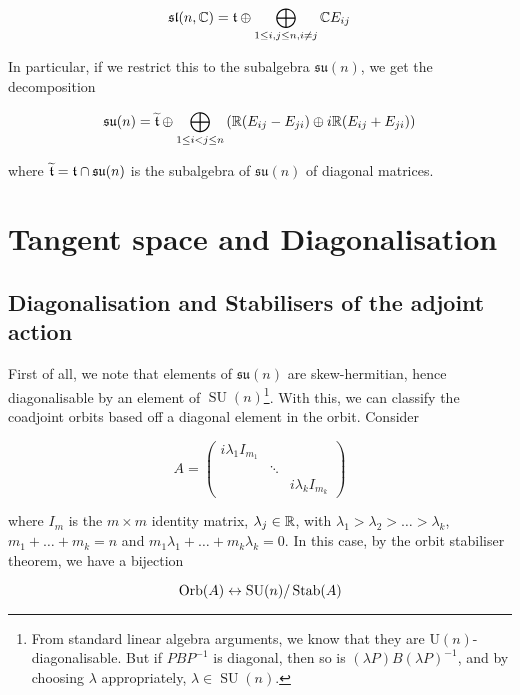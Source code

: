 \documentclass{article}
\DeclareMathOperator{\SU}{SU}
\newcommand{\su}{\mathfrak{su}}
\renewcommand{\sl}{\mathfrak{sl}}
\renewcommand{\tilde}{\widetilde}
\begin{document}
\begin{equation}
    \label{eq:sln-root}
    \sl(n, \C) = \mft \oplus \bigoplus_{1 \le i, j \le n, i \ne j} \C E_{ij}
\end{equation}

In particular, if we restrict this to the subalgebra \(\su(n)\), we get the decomposition

\begin{equation}
    \label{eq:sun-root}
    \su(n) = \tilde\mft \oplus \bigoplus_{1 \le i < j \le n} \left(\R(E_{ij} - E_{ji}) \oplus i\R (E_{ij} + E_{ji})\right)
\end{equation}

where \(\tilde \mft = \mft \cap \su(n)\) is the subalgebra of \(\su(n)\) of diagonal matrices. 

\section{Tangent space and Diagonalisation}

\label{sec:tangent}

\subsection{Diagonalisation and Stabilisers of the adjoint action}

First of all, we note that elements of \(\su(n)\) are skew-hermitian, hence diagonalisable by an element of \(\SU(n)\)\footnote{From standard linear algebra arguments, we know that they are \(\mathrm U(n)\)-diagonalisable. But if \(PBP^{-1}\) is diagonal, then so is \((\lambda P)B(\lambda P)^{-1}\), and by choosing \(\lambda\) appropriately, \(\lambda \in \SU(n)\).}. With this, we can classify the coadjoint orbits based off a diagonal element in the orbit. Consider

\[A = \begin{pmatrix}
    i\lambda_1 I_{m_1} \\
    & \ddots \\
    & & i\lambda_k I_{m_k}
\end{pmatrix}\]

where \(I_m\) is the \(m \times m\) identity matrix, \(\lambda_j \in \mathbb{R}\), with \(\lambda_1 > \lambda_2 > \dots > \lambda_k\), \(m_1 + \dots + m_k = n\) and \(m_1\lambda_1 + \dots + m_k\lambda_k = 0\). In this case, by the orbit stabiliser theorem, we have a bijection

\[\Orb(A) \leftrightarrow \SU(n)/\Stab(A)\]
\end{document}
